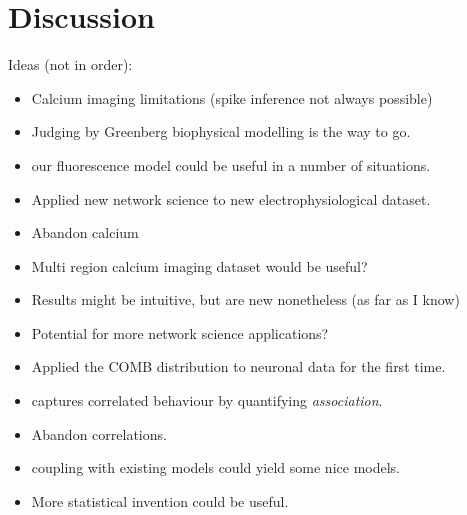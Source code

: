\chapter{Discussion}
Ideas (not in order):
\begin{itemize}
  \item Calcium imaging limitations (spike inference not always possible)
  \item Judging by Greenberg biophysical modelling is the way to go.
  \item our fluorescence model could be useful in a number of situations.
  \item Applied new network science to new electrophysiological dataset.
  \item Abandon calcium
  \item Multi region calcium imaging dataset would be useful?
  \item Results might be intuitive, but are new nonetheless (as far as I know)
  \item Potential for more network science applications?
  \item Applied the COMB distribution to neuronal data for the first time.
  \item captures correlated behaviour by quantifying \textit{association}.
  \item Abandon correlations.
  \item coupling with existing models could yield some nice models.
  \item More statistical invention could be useful.
\end{itemize}
